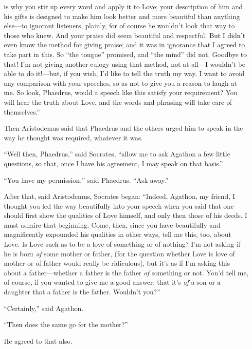 is why you stir up every word and apply it to Love; your description of
him and  his gifts is designed to make him look better
and more beautiful than anything else---to ignorant listeners, plainly,
for of course he wouldn't look that way to those who knew. And your
praise did seem beautiful and respectful. But I didn't even know the
method for giving praise; and it was in ignorance that I agreed to take
part in this. So “the tongue” promised, and “the mind” did
not. Goodbye to that!
I'm not giving another eulogy using that method, not at all---I wouldn't
be able to do  it!---but, if you wish, I'd like to tell the truth
my way. I want to avoid any comparison with your speeches, so as not to
give you a reason to laugh at me. So look, Phaedrus, would a speech like
this satisfy your requirement? You will hear the truth about Love, and
the words and phrasing will take care of themselves.”

Then Aristodemus said that Phaedrus and the others urged him to speak in
the way he thought was required, whatever it was.

“Well then, Phaedrus,” said Socrates, “allow me to ask Agathon a few
 little questions, so that, once I have his agreement, I may
speak on that basis.”

“You have my permission,” said Phaedrus. “Ask away.”

After that, said Aristodemus, Socrates began: “Indeed, Agathon, my
friend, I thought you led the way beautifully into your speech when you
said that one should first show the qualities of Love himself, and only
then those of his deeds. I must admire that beginning. Come, then, since
 you have beautifully and magnificently expounded his qualities
in other ways, tell me this, too, about Love. Is Love such as to be a
love of something or of nothing? I'm not asking if he is born {\em of}
some mother or father, (for the question whether Love is love of mother
or of father would really be ridiculous), but it's as if I'm asking this
about a father---whether a father is the father {\em of} something or
not. You'd tell me, of course, if you wanted to give me a good answer,
that it's {\em of} a son or a daughter that a father is the father.
Wouldn't you?”

“Certainly,” said Agathon.

“Then does the same go for the mother?”

 He agreed to that also.

